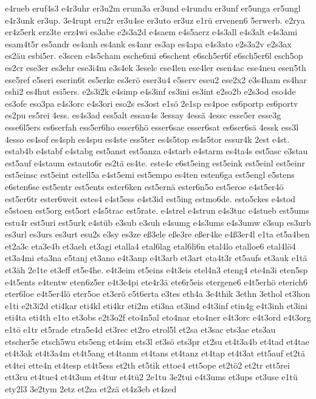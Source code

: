 {e4rueb
eruf4s3
e4r3uhr
er3u2m
erum3a
er3und
e4rundu
er3unf
er5unga
er5ungl
e4r3unk
er3up.
3e4rupt
eru2r
er3u4se
er3uto
er3uz
e1rü
ervenen6
5erwerb.
e2rya
er4z5erk
erz3te
erz4wi
es3abe
e2s3a2d
e4saem
e4s5aerz
e4s3all
e4s3alt
e4s3ami
esam4t5r
es5andr
es4anh
es4ank
es4anr
es3ap
es4apa
e4s3ato
e2s3a2v
e2s3ax
es2äu
esbi5er.
e3scen
e4s5cham
esche6mi
e6schent
e6sch5er6f
e6sch5er6l
esch5op
es2cr
ese3er
es3ehr
ese3i4m
e3s4ek
3eselc
ese4len
ese4ler
esen4ac
ese4neu
esen5th
ese5ref
e5seri
eserin6t
es5erke
es3erö
eser3u4
e5serv
eseu2
ese2x2
e3s4ham
es4har
eshi2
es4hut
esi5ers.
e2s3i2k
e4simp
e4s3inf
es3ini
es3int
e2so2b
e2s3od
eso4de
es3ofe
eso3pa
e4s3orc
e4s3ori
eso2s
es3ost
e1sö
2e1sp
es4poe
es6portp
es6portv
es2pu
es5rei
4ess.
es4s3ad
ess5alt
essau4s
3essay
4essä
4essc
esse5er
esse3g
esse6l5ers
es6serfah
ess5er6ho
esser6hö
esser6sae
esser6sat
es6ser6sä
4essk
ess3l
4esso
es4sof
es4sph
es4spu
es4ste
ess5ter
es4s5top
es4s5tor
essur4k
2est
e4st.
estab4b
e4stabf
e4stabg
est5anst
est5anza
e4starb
e4starm
es4ta4s
est5asc
e3stau
est5auf
e4staum
estauto6r
es2tä
es4te.
este4c
e6st5eing
est5eink
est5einl
est5einr
est5einsc
est5eint
estell5a
e4st5emi
est5empo
es4ten
esten6ga
est5engl
e5stens
e6sten6se
est5entr
est5ents
ester6ken
est5ernä
ester6n5o
est5eroe
e4st5er4ö
est5er6tr
ester6weit
estes4
e4st5ess
e4st3id
est5ing
estmo6de.
esto5ckes
e4stod
e5stoen
est5org
est5ort
e4s5trac
est5rate.
e4strel
e4strun
e4s3tuc
e4stueb
est5ums
estu4r
est5uri
est5urk
e4stüb
e3sub
e3suh
e4sumg
e4s3ums
e4s3umw
e3sup
es3urb
es3url
es3urs
es3urt
esu2s
e3sy
es3ze
eß3ele
eße3re
eßer4ke
e4ß3er4l
e1ta
et5a4ben
et2a3c
eta3e4b
et3aeh
et3agi
etalla4
etal6lag
etal6li6n
etal4lo
etalloe6
etal4lö4
et3a4mi
eta3na
e5tanj
et3ano
e4t3anp
e4t3arb
et3art
eta4t3r
et5aufs
et3auk
e1tä
et3äh
2e1te
et3eff
et5e4he.
e4t3eim
et5eins
e4t3eis
etel4n3
eteng4
ete4n3i
eten5sp
e4t5ents
e4tentw
eten6z5er
e4t3e4pi
ete4r3ä
ete6r5eis
etergene6
e4t5erhö
eterich6
eter6loe
e4t5er4lö
eter5oe
et3erö
e5t6erta
e3tes
eth4a
3e4thik
3ethn
3ethol
et3hon
e1ti
e2t3i2d
eti4kar
eti4kl
eti4kr
eti2m
eti3na
et3ind
e4t3inf
etin4g
e4t3inh
et3ini
eti4ta
eti4th
e1to
et3obs
e2t3o2f
eto4n5al
eto4nar
eto4ner
e4t3orc
e4t3ord
e4t3org
e1tö
e1tr
et5rade
etra5e4d
et3rec
et2ro
etrol5l
et2sa
et3sac
ets3ae
ets3au
etscher5e
etsch5wu
ets5eng
et4sim
ets3l
et3sö
ets3pr
et2su
et4t3a4b
et4tad
et4tae
et4t3ak
et4t3a4m
et4t5ang
et4tanm
et4tans
et4tanz
et4tap
et4t3at
ett5auf
et2tä
et4tei
ette4n
et4tesp
et4t5ess
et2th
et5tik
ettoe4
ett5ope
et2tö2
et2tr
ett5rei
ett3ru
et4tue4
et4t3um
et4tur
et4tü2
2e1tu
3e2tui
e4t3ums
et3ups
et3use
e1tü
ety2l3
3e2tym
2etz
et2za
et2zä
et4z3eb
et4zed
}
